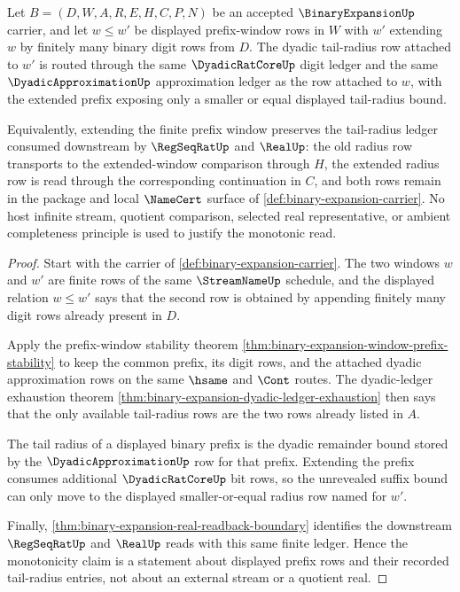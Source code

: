 \begin{theorem}
\label{thm:binary-expansion-prefix-tail-radius-monotonicity}
Let $B=(D,W,A,R,E,H,C,P,N)$ be an accepted $\BinaryExpansionUp$ carrier, and let $w \leq w'$ be displayed prefix-window rows in $W$ with $w'$ extending $w$ by finitely many binary digit rows from $D$. The dyadic tail-radius row attached to $w'$ is routed through the same $\DyadicRatCoreUp$ digit ledger and the same $\DyadicApproximationUp$ approximation ledger as the row attached to $w$, with the extended prefix exposing only a smaller or equal displayed tail-radius bound.

Equivalently, extending the finite prefix window preserves the tail-radius ledger consumed downstream by $\RegSeqRatUp$ and $\RealUp$: the old radius row transports to the extended-window comparison through $H$, the extended radius row is read through the corresponding continuation in $C$, and both rows remain in the package and local $\NameCert$ surface of \autoref{def:binary-expansion-carrier}. No host infinite stream, quotient comparison, selected real representative, or ambient completeness principle is used to justify the monotonic read.
\end{theorem}
\begin{proof}
Start with the carrier of \autoref{def:binary-expansion-carrier}. The two windows $w$ and $w'$ are finite rows of the same $\StreamNameUp$ schedule, and the displayed relation $w \leq w'$ says that the second row is obtained by appending finitely many digit rows already present in $D$.

Apply the prefix-window stability theorem \autoref{thm:binary-expansion-window-prefix-stability} to keep the common prefix, its digit rows, and the attached dyadic approximation rows on the same $\hsame$ and $\Cont$ routes. The dyadic-ledger exhaustion theorem \autoref{thm:binary-expansion-dyadic-ledger-exhaustion} then says that the only available tail-radius rows are the two rows already listed in $A$.

The tail radius of a displayed binary prefix is the dyadic remainder bound stored by the $\DyadicApproximationUp$ row for that prefix. Extending the prefix consumes additional $\DyadicRatCoreUp$ bit rows, so the unrevealed suffix bound can only move to the displayed smaller-or-equal radius row named for $w'$.

Finally, \autoref{thm:binary-expansion-real-readback-boundary} identifies the downstream $\RegSeqRatUp$ and $\RealUp$ reads with this same finite ledger. Hence the monotonicity claim is a statement about displayed prefix rows and their recorded tail-radius entries, not about an external stream or a quotient real.
\end{proof}

